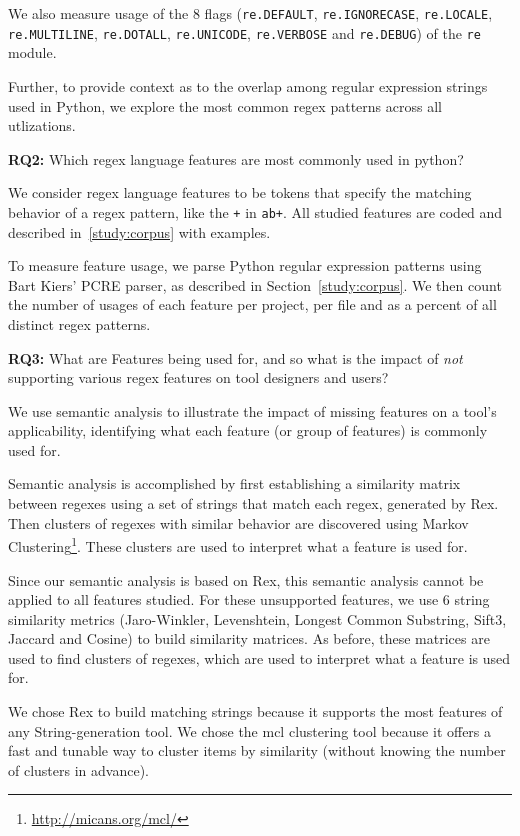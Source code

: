 We also measure usage of the 8 flags ({\tt re.DEFAULT}, {\tt re.IGNORECASE}, {\tt re.LOCALE}, {\tt re.MULTILINE}, {\tt re.DOTALL}, {\tt re.UNICODE}, {\tt re.VERBOSE} and {\tt re.DEBUG}) of the {\tt re} module.

Further, to provide context as to the overlap among regular expression strings used in Python, we explore the most common regex {patterns} across all utlizations. 

\textbf{RQ2:} Which regex language features are most commonly used in python?

We consider regex language features to be tokens that specify the matching behavior of a regex pattern, like the {\tt +} in {\tt ab+}.  All studied features are coded and described in~\ref{study:corpus} with examples.

To measure feature usage, we parse Python regular expression patterns using Bart Kiers' PCRE parser, as described in Section~\ref{study:corpus}.  We then count the number of usages of each feature per project, per file and as a percent of all distinct regex patterns.

\textbf{RQ3:} What are Features being used for, and so what is the impact of \emph{not} supporting various regex features on tool designers and users?

We use semantic analysis to illustrate the impact of missing features on a tool's applicability, identifying what each feature (or group of features) is commonly used for.

Semantic analysis is accomplished by first establishing a similarity matrix between regexes using a set of strings that match each regex, generated by Rex.  Then clusters of regexes with similar behavior are discovered using Markov Clustering\footnote{\url{http://micans.org/mcl/}}.  These clusters are used to interpret what a feature is used for.

Since our semantic analysis is based on Rex, this semantic analysis cannot be applied to all features studied.  For these unsupported features, we use 6 string similarity metrics (Jaro-Winkler, Levenshtein, Longest Common Substring, Sift3, Jaccard and Cosine) to build similarity matrices.  As before, these matrices are used to find clusters of regexes, which are used to interpret what a feature is used for.

We chose Rex to build matching strings because it supports the most features of any String-generation tool.  We chose the mcl clustering tool because it offers a fast and tunable way to cluster items by similarity (without knowing the number of clusters in advance).



